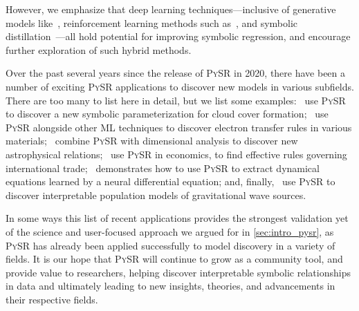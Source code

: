 \documentclass[letterpaper,twocolumn]{scrartcl}
\newcommand\pysr{\textsc{PySR}\xspace}
\begin{document}
\begin{linenumbers}
However, we emphasize that deep learning techniques---inclusive of generative models like~\cite{kamiennyEndtoendSymbolicRegression2022}, reinforcement learning methods such as~\cite{petersenDeepSymbolicRegression2021}, and symbolic distillation~\cite{cranmerDiscoveringSymbolicModels2020}---all hold potential for improving symbolic regression, and encourage further exploration of such hybrid methods.

Over the past several years since the release of \pysr in 2020, there have been a number of exciting \pysr applications to discover new models in various subfields. There are too many to list here in detail, but we list some examples:~\cite{grundnerDataDrivenEquationDiscovery2023} use \pysr to discover a new symbolic parameterization for cloud cover formation;~\cite{liElectronTransferRules2023} use \pysr alongside other ML techniques to discover electron transfer rules in various materials;~\cite{matchevAnalyticalModelingExoplanet2022,wadekarSZFluxmassYM2022,wadekarAugmentingAstrophysicalScaling2022} combine \pysr with dimensional analysis to discover new astrophysical relations;~\cite{verstyukMachineLearningGravity2022} use \pysr in economics, to find effective rules governing international trade;~\cite{kidgerNeuralDifferentialEquations2022} demonstrates how to use \pysr to extract dynamical equations learned by a neural differential equation; and, finally,~\cite{wongAutomatedDiscoveryInterpretable2022} use \pysr to discover interpretable population models of gravitational wave sources.


In some ways this list of recent applications provides the strongest validation yet of the science and user-focused approach we argued for in \cref{sec:intro_pysr}, as \pysr has already been applied successfully to model discovery in a variety of fields.
It is our hope that \pysr will continue to grow as a community tool, and provide value to researchers, helping discover interpretable symbolic relationships in data and ultimately leading to new insights, theories, and advancements in their respective fields.






\end{linenumbers}
\end{document}
